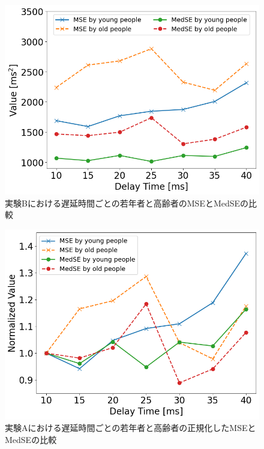 \begin{figure}[tbp]
  \centering
  \includegraphics[scale=0.5]{figures/Honbann/Comparison_young_old/40ms_MSE-MedSE.png}
  \caption{実験Bにおける遅延時間ごとの若年者と高齢者のMSEとMedSEの比較}
  \label{fig:40ms_MSE_MedSE}
\end{figure}

\begin{figure}[tbp]
  \centering
  \includegraphics[scale=0.5]{figures/Honbann/Comparison_young_old/Normalized_40ms_MSE-MedSE.png}
  \caption{実験Aにおける遅延時間ごとの若年者と高齢者の正規化したMSEとMedSEの比較}
  \label{fig:Normalized_40ms_MSE_MedSE}
\end{figure}